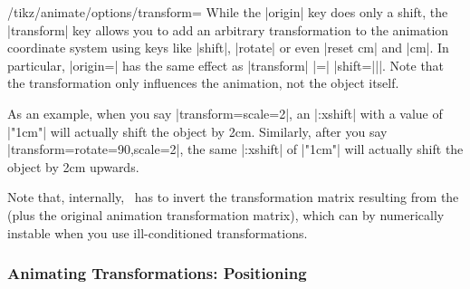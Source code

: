 \begin{key}{/tikz/animate/options/transform=}
    While the |origin| key does only a shift, the |transform| key allows you to
    add an arbitrary transformation to the animation coordinate system using
    keys like |shift|, |rotate| or even |reset cm| and |cm|. In particular,
    |origin=| has the same effect as |transform| |=|
    |{shift=||}|. Note that the transformation only influences the
    animation, not the object itself.

    As an example, when you say |transform={scale=2}|, an |:xshift| with a
    value of |"1cm"| will actually shift the object by 2cm. Similarly, after
    you say |transform={rotate=90,scale=2}|, the same |:xshift| of |"1cm"| will
    actually shift the object by 2cm upwards.

    Note that, internally, \tikzname\ has to invert the transformation matrix
    resulting from the  (plus the original animation
    transformation matrix), which can by numerically instable when you use
    ill-conditioned transformations.
\begin{codeexample}[imagesource={standalone/pgfmanual-en-tikz-animations-animation-46.svg}]
\end{codeexample}
\begin{codeexample}[imagesource={standalone/pgfmanual-en-tikz-animations-animation-47.svg}]
\end{codeexample}
\end{key}


\subsubsection{Animating Transformations: Positioning}

